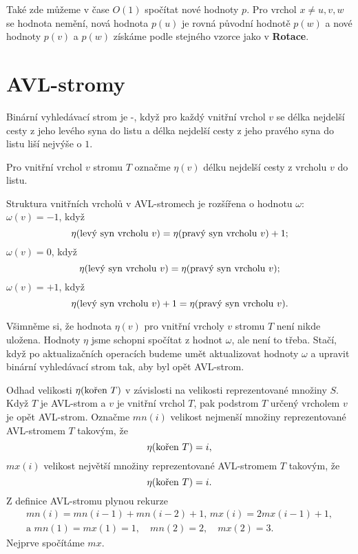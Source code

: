 \documentclass[a4paper,12pt]{article}
\def \emph#1{\underbar{#1}}
\begin{document}
Také zde můžeme v čase $O(1)$ spočítat nové hodnoty $
p$. 
Pro vrchol $x\ne u,v,w$ se hodnota nemění, nová hodnota 
$p(u)$ je 
rovná původní hodnotě $p(w)$ a nové hodnoty $
p(v)$ 
a $p(w)$ 
získáme pod\-le stejného vzorce  jako v {\bf Rotace}.

\section{AVL-stromy}

Binární vyhledávací strom je 
\emph{AVL}-\emph{strom}, když pro každý vnitř\-ní vrchol 
$v$ se délka nejdelší cesty z jeho levého syna do 
listu a délka nejdelší cesty z jeho pravého syna do listu 
liší nejvýše o $1$.  

Pro vnitřní vrchol $v$ stromu $T$ označme $\eta 
(v)$ 
délku nejdelší cesty z vrcholu $v$ do listu.

 

Struktura vnitřních vrcholů v 
AVL-stromech je rozšířena o hodnotu $\omega$:\newline 
$\omega (v)=-1$, když 
$$\eta (\text{\rm levý syn vrcholu }v)=\eta (\text{\rm pravý syn vrcholu }
v)+1;$$
$\omega (v)=0$, když 
$$\eta (\text{\rm levý syn vrcholu }v)=\eta (\text{\rm pravý syn vrcholu }
v);$$
$\omega (v)=+1$, když
$$\eta (\text{\rm levý syn vrcholu }v)+1=\eta (\text{\rm pravý syn vrcholu }
v).$$

Všimněme si, že hodnota $\eta (v)$ pro vnitřní vrcholy 
$v$ stromu $T$ není nikde uložena.  Hodnoty $\eta$ jsme schopni 
spočítat z hodnot $\omega$, ale není to třeba.  Stačí, když po 
aktualizačních operacích budeme umět aktualizovat 
hodnoty $\omega$ a upravit binární vy\-hledávací strom tak, 
aby byl opět AVL-strom.

Odhad velikosti $\eta (\text{\rm kořen }T)$ v závislosti na 
velikosti reprezentované množiny $S$.\newline 
Když $T$ je AVL-strom a $v$ je vnitřní vrchol $T$, pak 
podstrom $T$ určený vrcholem $v$ je opět AVL-strom. 
Označme\newline 
$mn(i)$ velikost nejmenší množiny reprezentované 
AVL-stromem $T$ takovým, že $$\eta (\text{\rm kořen }T)=i,$$ 
$mx(i)$ velikost největší množiny reprezentované 
AVL-stromem $T$ takovým, že $$\eta (\text{\rm kořen }T)=i.$$ 
Z definice AVL-stromu plynou rekurze
\begin{gather*} mn(i)=mn(i-1)+mn(i-2)+1,\,mx(i)=2mx(i-1)+1,\\
\text{a }mn(1)=mx(1)=1,\quad mn(2)=2,\quad mx(2)=3.\end{gather*}
Nejprve spočítáme $mx$.
\end{document}

